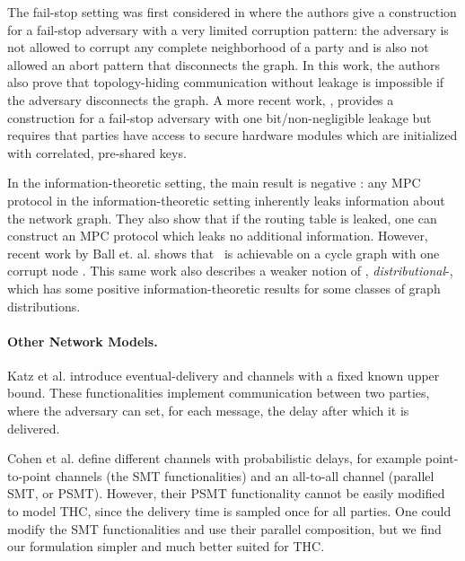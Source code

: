 The fail-stop setting was first considered in \cite{TCC:MorOrlRic15} where the authors give a construction for a fail-stop adversary with a very limited corruption pattern: the adversary is not allowed to corrupt any complete neighborhood of a party and is also not allowed an abort pattern that disconnects the graph. In this work, the authors also prove that topology-hiding communication without leakage is impossible if the adversary disconnects the graph. A more recent work, \cite{BBMM18}, provides a construction for a fail-stop adversary with one bit/non-negligible leakage but requires that parties have access to secure hardware modules which are initialized with correlated, pre-shared keys.

In the information-theoretic setting, the main result is negative \cite{HJ07}: any MPC protocol in the information-theoretic setting inherently leaks information about the network graph. They also show that if the routing table is leaked, one can construct an MPC protocol which leaks no additional information. However, recent work by Ball et. al. shows that \THC~is achievable on a cycle graph with one corrupt node \cite{BBCMM19}. This same work also describes a weaker notion of \THC, \emph{distributional}-\THC, which has some positive information-theoretic results for some classes of graph distributions.

\paragraph{Other Network Models.}
Katz et al. \cite{KMTZ13} introduce eventual-delivery and channels with a fixed known upper bound. These functionalities implement communication between two parties, where the adversary can set, for each message, the delay after which it is delivered. %

Cohen et al. \cite{CCGZ16} define different channels with probabilistic 
delays, for example point-to-point channels (the SMT functionalities) and an 
all-to-all channel (parallel SMT, or PSMT).
However, their PSMT functionality cannot be easily modified to model THC, since 
the delivery time is sampled once for all parties.
One could modify the SMT functionalities and use their parallel composition, 
but we find our formulation simpler and much better suited for THC.

